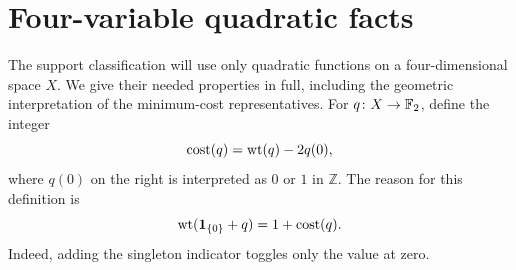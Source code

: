 \section{Four-variable quadratic facts}\label{sec:quad-four}
The support classification will use only quadratic functions on a four-dimensional space $X$. We give their needed properties in full, including the geometric interpretation of the minimum-cost representatives. For $q\colon X\to\mathbb F_2$, define the integer
\begin{equation}\label{eq:cost}
\operatorname{cost}(q)=\operatorname{wt}(q)-2q(0),
\end{equation}
where $q(0)$ on the right is interpreted as $0$ or $1$ in $\mathbb Z$. The reason for this definition is
\begin{equation}\label{eq:delta-cost}
\operatorname{wt}(\mathbf 1_{\{0\}}+q)=1+\operatorname{cost}(q).
\end{equation}
Indeed, adding the singleton indicator toggles only the value at zero.

